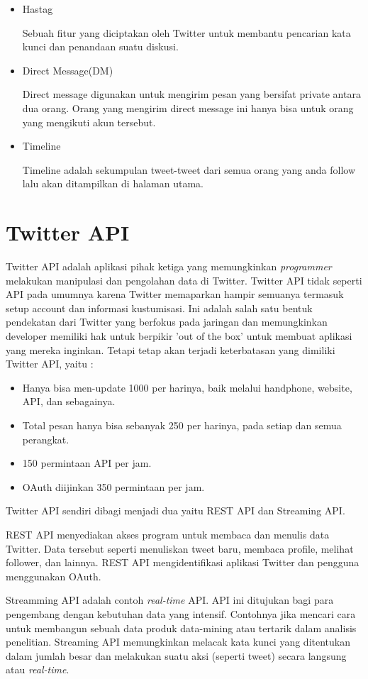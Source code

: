 \begin{itemize}
	\item Hastag
	
	Sebuah fitur yang diciptakan oleh Twitter untuk membantu pencarian kata kunci dan penandaan suatu diskusi.
	
	\item Direct Message(DM)
	
	Direct message digunakan untuk mengirim pesan yang bersifat private antara dua orang. Orang yang mengirim direct message ini hanya bisa untuk orang yang mengikuti akun tersebut.
	\item Timeline
	
	Timeline adalah sekumpulan tweet-tweet dari semua orang yang anda follow lalu akan ditampilkan di halaman utama.
\end{itemize}


	

\section{Twitter API}
Twitter API adalah aplikasi pihak ketiga yang memungkinkan \textit{programmer} melakukan manipulasi dan pengolahan data di Twitter. Twitter API tidak seperti API pada umumnya karena Twitter memaparkan hampir semuanya termasuk setup account dan informasi kustumisasi. Ini adalah salah satu bentuk pendekatan dari Twitter yang berfokus pada jaringan dan memungkinkan developer memiliki hak untuk berpikir 'out of the box' untuk membuat aplikasi yang mereka inginkan. Tetapi tetap akan terjadi keterbatasan yang dimiliki Twitter API, yaitu :
\begin{itemize}
	\item Hanya bisa men-update 1000 per harinya, baik melalui handphone, website, API, dan sebagainya.
	\item Total pesan hanya bisa sebanyak 250 per harinya, pada setiap dan semua perangkat.
	\item 150 permintaan API per jam.
	\item OAuth diijinkan 350 permintaan per jam.
\end{itemize}

Twitter API sendiri dibagi menjadi dua yaitu REST API dan Streaming API.


REST API menyediakan akses program untuk membaca dan menulis data Twitter. Data tersebut seperti menuliskan tweet baru, membaca profile, melihat follower, dan lainnya. REST API mengidentifikasi aplikasi Twitter dan pengguna menggunakan OAuth.

Streamming API adalah contoh \textit{real-time} API. API ini ditujukan bagi para pengembang dengan kebutuhan data yang intensif. Contohnya jika mencari cara untuk membangun sebuah data produk data-mining atau tertarik dalam analisis penelitian. Streaming API memungkinkan melacak kata kunci yang ditentukan dalam jumlah besar dan melakukan suatu aksi (seperti tweet) secara langsung atau \textit{real-time}.

